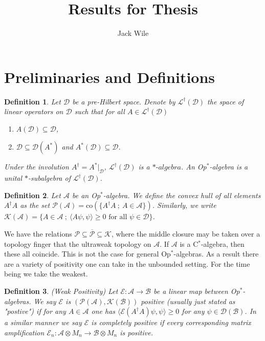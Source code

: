\documentclass[12pt]{article}
\title{Results for Thesis}
\author{Jack Wile}
\date{}
\newtheorem*{definition}{Definition}
\newcommand\mc{\mathcal}
\newcommand\ms{\mathscr}
\newcommand{\ldag}[1]{\mathscr{L}^\dagger(\mathscr{#1})}
\newcommand{\ip}[2]{\langle #1, #2 \rangle}
\begin{document}
\maketitle


\section*{Preliminaries and Definitions}

\begin{definition}
	Let $\mathscr{D}$ be a pre-Hilbert space. Denote by $\mathscr{L}^\dagger(\mathscr{D})$
	the space of linear operators on $\ms{D}$ such that for all $A \in \ldag{D}$ 

	\begin{enumerate}
		\item $A(\ms{D}) \subseteq \ms{D}$,
		\item $\ms{D} \subseteq \mc{D}(A^*)$ and $A^*(\ms{D}) \subseteq \ms{D}$.
	\end{enumerate}

	\noindent Under the involution $A^\dagger = A^*|_{\ms{D}}$, $\ldag{D}$ is a $*\text{-}algebra$. 
	An Op$^*$-algebra is a unital $*$-subalgebra of $\ldag{D}$.
\end{definition}

\begin{definition}
	Let $\ms{A}$ be an Op$^*$-algebra. We define the convex hull of all elements $A^\dagger A$ as the set
	$\mc{P}(\ms{A}) = \text{co}(\{A^\dagger A \ ; \ A \in \ms{A}\})$. Similarly, we write
	$\mc{K}(\ms{A}) = \{A \in \ms{A} \ ; \ \ip{A\psi}{\psi} \ge 0 \text{ for all } \psi \in \ms{D}\}$.


\end{definition}

We have the relations $\mc{P} \subseteq \overline{\mc{P}} \subseteq \mc{K}$, where the middle closure may be taken over a
topology finger that the ultraweak topology on $\ms{A}$. If $\ms{A}$ is a C$^*$-algebra, then these all coincide. This is not 
the case for general Op$^*$-algebras. As a result there are a variety of positivity one can take in the unbounded setting. 
For the time being we take the weakest.


\begin{definition} (Weak Positivity) Let $\mc{E}: \ms{A} \to \ms{B}$ be a linear map between Op$^*$-algebras. 
	We say $\mc{E}$ is $(\mc{P}(\ms{A}), \mc{K}(\ms{B}))$ positive (usually just stated as "postive")
	if for any $A \in \ms{A}$ one has 
	$\ip{\mc{E}(A^\dagger A)\psi}{\psi} \ge 0$ for any $\psi \in \mc{D}(\ms{B})$. In a similar manner 
	we say $\mc{E}$ is completely positive if every corresponding matrix amplification
	$\mc{E}_n:\ms{A} \otimes M_n \to \ms{B} \otimes M_n$ is positive. 
\end{definition}
\end{document}
